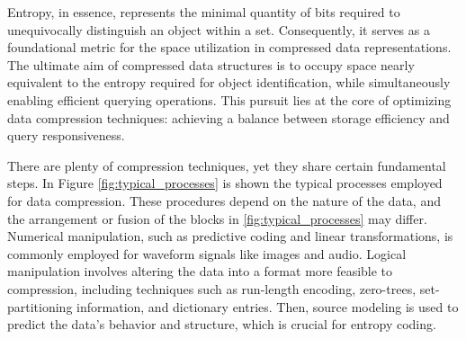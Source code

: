 Entropy, in essence, represents the minimal quantity of bits required to unequivocally distinguish an object within a set. Consequently, it serves as a foundational metric for the space utilization in compressed data representations. The ultimate aim of compressed data structures is to occupy space nearly equivalent to the entropy required for object identification, while simultaneously enabling efficient querying operations. This pursuit lies at the core of optimizing data compression techniques: achieving a balance between storage efficiency and query responsiveness.

\noindent There are plenty of compression techniques, yet they share certain fundamental steps. In Figure \ref{fig:typical_processes} is shown the typical processes employed for data compression. These procedures depend on the nature of the data, and the arrangement or fusion of the blocks in \ref{fig:typical_processes} may differ. Numerical manipulation, such as predictive coding and linear transformations, is commonly employed for waveform signals like images and audio. Logical manipulation involves altering the data into a format more feasible to compression, including techniques such as run-length encoding, zero-trees, set-partitioning information, and dictionary entries. Then, source modeling is used to predict the data's behavior and structure, which is crucial for entropy coding.

